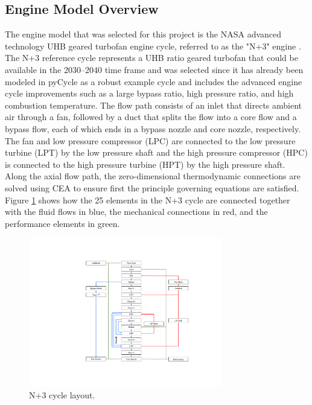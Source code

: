 \documentclass[12pt]{article}
\begin{document}
\subsection{Engine Model Overview}
The engine model that was selected for this project is the NASA advanced technology UHB geared turbofan engine cycle, referred to as the "N+3" engine \cite{Jones2017a}.
The N+3 reference cycle represents a UHB ratio geared turbofan that could be available in the 2030–2040 time frame and was selected since it has already been modeled in pyCycle as a robust example cycle and includes the advanced engine cycle improvements such as a large bypass ratio, high pressure ratio, and high combustion temperature.
The flow path consists of an inlet that directs ambient air through a fan, followed by a duct that splits the flow into a core flow and a bypass flow, each of which ends in a bypass nozzle and core nozzle, respectively.
The fan and low pressure compressor (LPC) are connected to the low pressure turbine (LPT) by the low pressure shaft and the high pressure compressor (HPC) is connected to the high pressure turbine (HPT) by the high pressure shaft.
Along the axial flow path, the zero-dimensional thermodynamic connections are solved using CEA to ensure first the principle governing equations are satisfied.
Figure \ref{fig:N3_original} shows how the 25 elements in the N+3 cycle are connected together with the fluid flows in blue, the mechanical connections in red, and the performance elements in green.

\begin{figure}[!hbt]
    \centering
    \includegraphics[width=0.75\textwidth]{N3_diagram.pdf}
    \caption{N+3 cycle layout.}
    \label{fig:N3_original}
\end{figure}
\end{document}
